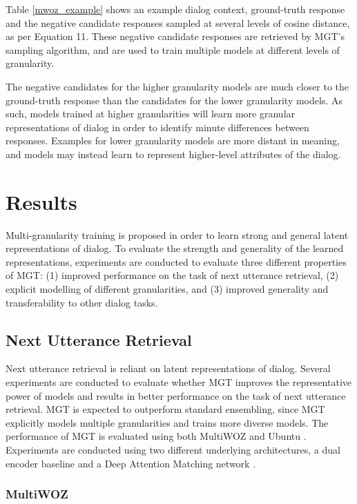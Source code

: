 \documentclass[11pt,a4paper]{article}
\begin{document}
Table \ref{mwoz_example} shows an example dialog context, ground-truth response and the negative candidate responses sampled at several levels of cosine distance, as per Equation 11. These negative candidate responses are retrieved by MGT's sampling algorithm, and are used to train multiple models at different levels of granularity.

The negative candidates for the higher granularity models are much closer to the ground-truth response than the candidates for the lower granularity models. As such, models trained at higher granularities will learn more granular representations of dialog in order to identify minute differences between responses. Examples for lower granularity models are more distant in meaning, and models may instead learn to represent higher-level attributes of the dialog.

\section{Results}

Multi-granularity training is proposed in order to learn strong and general latent representations of dialog. To evaluate the strength and generality of the learned representations, experiments are conducted to evaluate three different properties of MGT: (1) improved performance on the task of next utterance retrieval, (2) explicit modelling of different granularities, and (3) improved generality and transferability to other dialog tasks.



\subsection{Next Utterance Retrieval}

Next utterance retrieval is reliant on latent representations of dialog. Several experiments are conducted to evaluate whether MGT improves the representative power of models and results in better performance on the task of next utterance retrieval. MGT is expected to outperform standard ensembling, since MGT explicitly models multiple granularities and trains more diverse models. The performance of MGT is evaluated using both MultiWOZ \citep{budzianowski2018multiwoz} and Ubuntu \citep{lowe2015ubuntu}. Experiments are conducted using two different underlying architectures, a dual encoder baseline \citep{lowe2015ubuntu} and a Deep Attention Matching network \citep{zhou2018multi}. 


\subsubsection{MultiWOZ}
\end{document}
